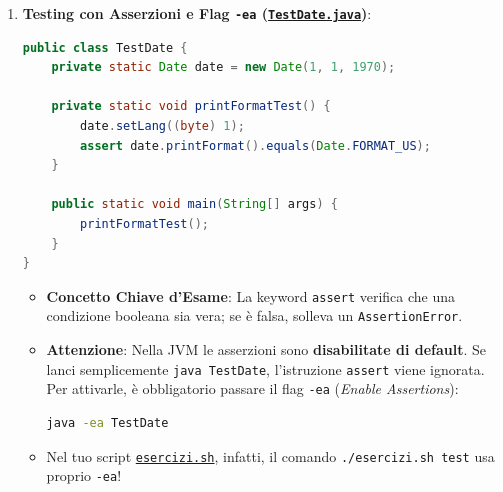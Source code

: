 \documentclass[11pt,a4paper]{article}
\newcommand{\passthrough}[1]{#1}
\begin{document}
\begin{enumerate}
  \begin{itemize}
  \item
    Nei getter di \passthrough{\lstinline!Date.java!} (righe 38--39 del
    codice ufficiale), il prof ha inavvertitamente scritto:

\begin{lstlisting}[language=Java]
public int getMonth() { return day; }
public int getYear() { return day; }
\end{lstlisting}

    Sia \passthrough{\lstinline!getMonth()!} che
    \passthrough{\lstinline!getYear()!} restituiscono il campo
    \passthrough{\lstinline!day!} anziché
    \passthrough{\lstinline!month!} e \passthrough{\lstinline!year!}!
    Nel tuo codice assicurati di restituire i campi corretti
    (\passthrough{\lstinline!return month;!} e
    \passthrough{\lstinline!return year;!}).
  \end{itemize}
\item
  \textbf{Testing con Asserzioni e Flag \passthrough{\lstinline!-ea!}
  (\href{file:///home/wally/Documenti/GitHub/Programmazione-II/25-26/Teoria-e-Esercitazioni/Codice-20260902/Lezione07/SimpleDate/src/TestDate.java}{\passthrough{\lstinline!TestDate.java!}})}:

\begin{lstlisting}[language=Java]
public class TestDate {
    private static Date date = new Date(1, 1, 1970);

    private static void printFormatTest() {
        date.setLang((byte) 1);
        assert date.printFormat().equals(Date.FORMAT_US);
    }

    public static void main(String[] args) {
        printFormatTest();
    }
}
\end{lstlisting}

  \begin{itemize}
  \item
    \textbf{Concetto Chiave d'Esame}: La keyword
    \passthrough{\lstinline!assert!} verifica che una condizione
    booleana sia vera; se è falsa, solleva un
    \passthrough{\lstinline!AssertionError!}.
  \item
    \textbf{Attenzione}: Nella JVM le asserzioni sono
    \textbf{disabilitate di default}. Se lanci semplicemente
    \passthrough{\lstinline!java TestDate!}, l'istruzione
    \passthrough{\lstinline!assert!} viene ignorata. Per attivarle, è
    obbligatorio passare il flag \passthrough{\lstinline!-ea!}
    (\emph{Enable Assertions}):

\begin{lstlisting}[language=bash]
java -ea TestDate
\end{lstlisting}
  \item
    Nel tuo script
    \href{file:///home/wally/Documenti/GitHub/Programmazione-II/25-26/esercizi-wally-25-26/esercizi.sh}{\passthrough{\lstinline!esercizi.sh!}},
    infatti, il comando \passthrough{\lstinline!./esercizi.sh test!} usa
    proprio \passthrough{\lstinline!-ea!}!
  \end{itemize}
\end{enumerate}
\end{document}
